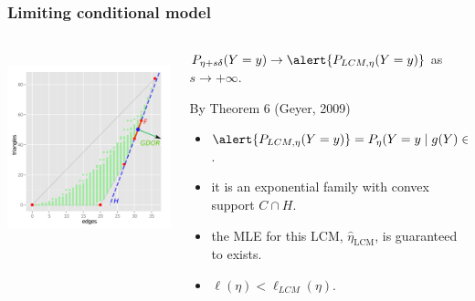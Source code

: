 \documentclass[slidestop,compress, 10pt]{beamer}
\newcommand{\etaLCM}{\hat{\eta}_{\textrm{LCM}}}
\begin{document}
\frame
{
	\frametitle{Limiting conditional model}
\begin{columns}[]
\begin{column}[T]{0.25\textwidth}
\includegraphics[height=2.2in,trim=3.5in 2in 0.15in 0.05in,clip=true]{g9-H.png}
\end{column} %

\begin{column}[t]{0.75\textwidth}
$P_{\eta + s \delta}( Y = y) \to \alert{P_{LCM, \eta}( Y = y)}$ as $s \to +\infty$.
\begin{block}{
By Theorem 6 (Geyer, 2009)}
\begin{itemize}
	\item $\alert{P_{LCM, \eta}( Y = y)} = P_{\eta}( Y =y \mid g(Y) \in H)$.
\vspace{1mm}
	
	\item it is an exponential family with convex support $C \cap H$.
\vspace{1mm}

	\item the MLE for this LCM, $\etaLCM$, is guaranteed to exists.
\vspace{1mm}

	\item $\ell(\eta) < \ell_{LCM}(\eta)$.
\end{itemize}
\end{block}

\end{column}
\end{columns}
}
\end{document}
